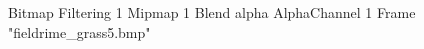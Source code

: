 {Bitmap
	{Filtering 1}
	{Mipmap 1}
	{Blend alpha}
	{AlphaChannel 1}
	{Frame "fieldrime_grass5.bmp"}
}
